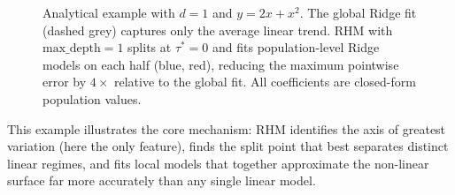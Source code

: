 \documentclass[11pt,a4paper]{article}
\begin{document}
\begin{figure}[ht]
\centering
{}
\caption{Analytical example with $d=1$ and $y = 2x + x^2$. The global Ridge fit (dashed grey) captures only the average linear trend. RHM with $\text{max\_depth}=1$ splits at $\tau^* = 0$ and fits population-level Ridge models on each half (blue, red), reducing the maximum pointwise error by $4\times$ relative to the global fit. All coefficients are closed-form population values.}\label{fig:example}
\end{figure}

This example illustrates the core mechanism: RHM identifies the axis of greatest variation (here the only feature), finds the split point that best separates distinct linear regimes, and fits local models that together approximate the non-linear surface far more accurately than any single linear model.
\end{document}
